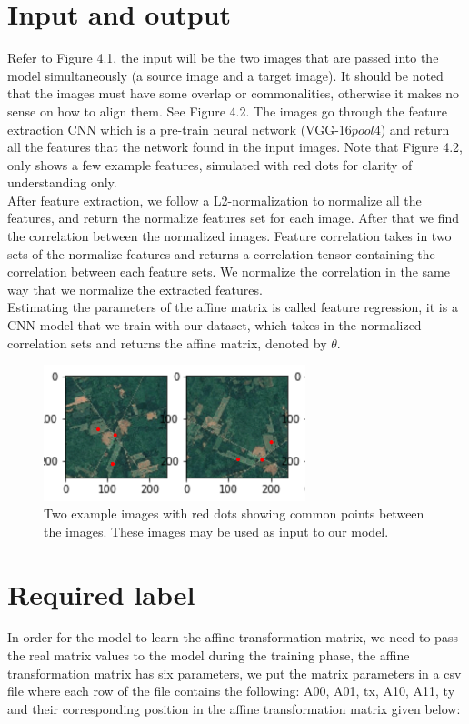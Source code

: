 \section{Input and output}
Refer to Figure 4.1, the input will be the two images that are passed into the model simultaneously (a source image and a target image). It should be noted that the images must have some overlap or commonalities, otherwise it makes no sense on how to align them. See Figure 4.2. The images go through the feature extraction CNN which is a pre-train neural network (VGG-16$pool4$) and return all the features that the network found in the input images. Note that Figure 4.2, only shows a few example features, simulated with red dots for clarity of understanding only.\\
  After feature extraction, we follow a L2-normalization to normalize all the features, and return the normalize features set for each image. After that we find the correlation between the normalized images. Feature correlation takes in two sets of the normalize features and returns a correlation tensor containing the correlation between each feature sets. We normalize the correlation in the same way that we normalize the extracted features.\\
  Estimating the parameters of the affine matrix is called feature regression, it is a CNN model that we train with our dataset, which takes in the normalized correlation sets and returns the affine matrix, denoted by $\theta$.
 
\begin{figure}
\centering
\includegraphics[width = 3.0in]{figs/data_example}
\caption{Two example images with red dots showing common points between the images. These images may be used as input to our model.}
\end{figure}
\section{Required label}
In order for the model to learn the affine transformation matrix, we need to pass the real matrix values to the model during the training phase, the affine transformation matrix  has six parameters, we put the matrix parameters in a csv file where each row of the file contains the following: A00, A01, tx, A10, A11, ty and their corresponding position in the affine transformation matrix given below:

